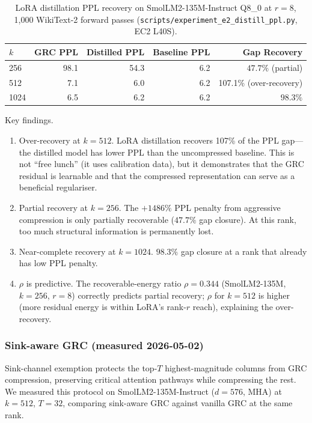 \documentclass[11pt]{article}
\begin{document}
\begin{table}[h]\centering\small
\caption{LoRA distillation PPL recovery on SmolLM2-135M-Instruct Q8\_0
at $r{=}8$, 1,000 WikiText-2 forward passes
(\texttt{scripts/experiment\_e2\_distill\_ppl.py}, EC2 L40S).}
\label{tab:distill-ppl}
\begin{tabular}{@{}lrrrr@{}}
\toprule
$k$ & GRC PPL & Distilled PPL & Baseline PPL & Gap Recovery \\
\midrule
256  & 98.1  & 54.3  & 6.2  & $47.7\%$ (partial) \\
512  & 7.1   & 6.0 & 6.2  & 107.1\% (over-recovery) \\
1024 & 6.5   & 6.2   & 6.2  & $98.3\%$ \\
\bottomrule
\end{tabular}
\end{table}

Key findings.
\begin{enumerate}
\item Over-recovery at $k{=}512$.  LoRA distillation recovers
      107\% of the PPL gap---the distilled model has lower PPL
      than the uncompressed baseline.  This is not ``free lunch''
      (it uses calibration data), but it demonstrates that the GRC
      residual is learnable and that the compressed representation
      can serve as a beneficial regulariser.
\item Partial recovery at $k{=}256$.  The $+1486\%$ PPL
      penalty from aggressive compression is only partially recoverable
      ($47.7\%$ gap closure).  At this rank, too much structural
      information is permanently lost.
\item Near-complete recovery at $k{=}1024$.  $98.3\%$ gap
      closure at a rank that already has low PPL penalty.
\item $\rho$ is predictive.  The recoverable-energy ratio
      $\rho{=}0.344$ (SmolLM2-135M, $k{=}256$, $r{=}8$) correctly
      predicts partial recovery; $\rho$ for $k{=}512$ is higher
      (more residual energy is within LoRA's rank-$r$ reach), explaining
      the over-recovery.
\end{enumerate}

\subsubsection{Sink-aware GRC (measured 2026-05-02)}

Sink-channel exemption protects the top-$T$ highest-magnitude columns
from GRC compression, preserving critical attention pathways while
compressing the rest.  We measured this protocol on
SmolLM2-135M-Instruct ($d{=}576$, MHA) at $k{=}512$, $T{=}32$,
comparing sink-aware GRC against vanilla GRC at the same rank.
\end{document}
